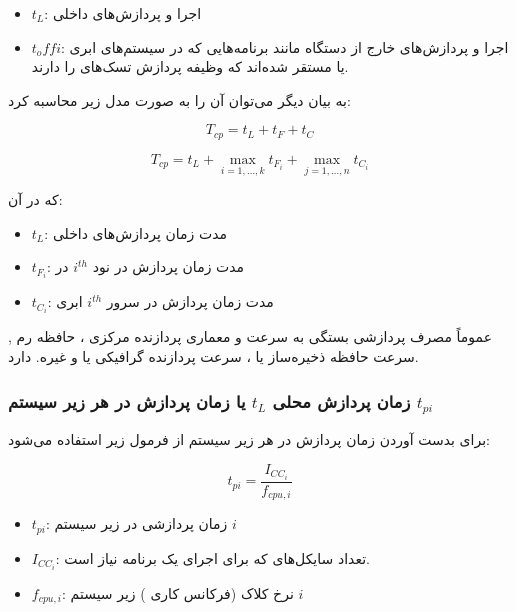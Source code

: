 \documentclass[a4paper]{article}
\begin{document}
\begin{itemize}
    \item $t_L$: اجرا و پردازش‌های داخلی
    \item $t_offi$: اجرا و پردازش‌های خارج از دستگاه  مانند برنامه‌هایی
    که در سیستم‌های ابری یا  مستقر شده‌اند که وظیفه پردازش تسک‌های
     را دارند.
\end{itemize}

به بیان دیگر می‌توان آن را به صورت مدل زیر محاسبه کرد:

\begin{equation}
    T_{cp} = t_L + t_F + t_C
\end{equation}

\begin{equation}
    T_{cp} = t_L + \max_{i=1, \ldots, k} t_{F_i} + \max_{j=1, \ldots, n} t_{C_i}
\end{equation}

که در آن:

\begin{itemize}
    \item $t_L$: مدت زمان پردازش‌های داخلی
    \item $t_{F_i}$: مدت زمان پردازش در نود $i^{th}$ در 
    \item $t_{C_i}$: مدت زمان پردازش در سرور $i^{th}$ ابری
\end{itemize}

عموماً مصرف پردازشی بستگی به سرعت و معماری پردازنده مرکزی ، حافظه رم
, سرعت حافظه ذخیره‌ساز  یا ، سرعت پردازنده گرافیکی
یا  و غیره. دارد.

\subsubsection{زمان پردازش محلی $t_L$ یا زمان پردازش در هر زیر سیستم $t_{pi}$}

برای بدست آوردن زمان پردازش در هر زیر سیستم از فرمول زیر استفاده می‌شود:

\begin{equation}
    t_{pi} = \frac{I_{CC_i}}{f_{cpu, i}}
\end{equation}

\begin{itemize}
    \item $t_{pi}$: زمان پردازشی در زیر سیستم $i$
    \item $I_{CC_i}$: تعداد سایکل‌های  که برای اجرای یک برنامه نیاز است.
    \item $f_{cpu, i}$: نرخ کلاک (فرکانس کاری ) زیر سیستم $i$
\end{itemize}
\end{document}
